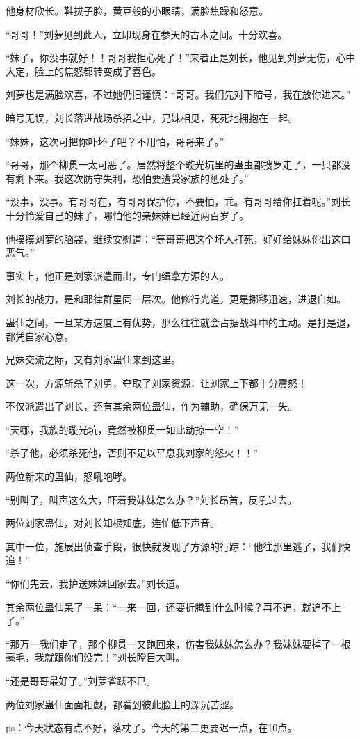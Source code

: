 \begin{this_body}
他身材欣长。鞋拔子脸，黄豆般的小眼睛，满脸焦躁和怒意。

“哥哥！”刘萝见到此人，立即现身在参天的古木之间。十分欢喜。

“妹子，你没事就好！！哥哥我担心死了！”来者正是刘长，他见到刘萝无伤，心中大定，脸上的焦怒都转变成了喜色。

刘萝也是满脸欢喜，不过她仍旧谨慎：“哥哥。我们先对下暗号，我在放你进来。”

暗号无误，刘长落进战场杀招之中，兄妹相见，死死地拥抱在一起。

“妹妹，这次可把你吓坏了吧？不用怕，哥哥来了。”

“哥哥，那个柳贯一太可恶了。居然将整个璇光坑里的蛊虫都搜罗走了，一只都没有剩下来。我这次防守失利，恐怕要遭受家族的惩处了。”

“没事，没事。有哥哥在，有哥哥保护你，不要怕，乖。有哥哥给你扛着呢。”刘长十分怜爱自己的妹子，哪怕他的亲妹妹已经近两百岁了。

他摸摸刘萝的脑袋，继续安慰道：“等哥哥把这个坏人打死，好好给妹妹你出这口恶气。”

事实上，他正是刘家派遣而出，专门缉拿方源的人。

刘长的战力，是和耶律群星同一层次。他修行光道，更是挪移迅速，进退自如。

蛊仙之间，一旦某方速度上有优势，那么往往就会占据战斗中的主动。是打是退，都凭自家心意。

兄妹交流之际，又有刘家蛊仙来到这里。

这一次，方源斩杀了刘勇，夺取了刘家资源，让刘家上下都十分震怒！

不仅派遣出了刘长，还有其余两位蛊仙，作为辅助，确保万无一失。

“天哪，我族的璇光坑，竟然被柳贯一如此劫掠一空！”

“杀了他，必须杀死他，否则不足以平息我刘家的怒火！！”

两位新来的蛊仙，怒吼咆哮。

“别叫了，叫声这么大，吓着我妹妹怎么办？”刘长昂首，反吼过去。

两位刘家蛊仙，对刘长知根知底，连忙低下声音。

其中一位，施展出侦查手段，很快就发现了方源的行踪：“他往那里逃了，我们快追！”

“你们先去，我护送妹妹回家去。”刘长道。

其余两位蛊仙呆了一呆：“一来一回，还要折腾到什么时候？再不追，就追不上了。”

“那万一我们走了，那个柳贯一又跑回来，伤害我妹妹怎么办？我妹妹要掉了一根毫毛，我就跟你们没完！”刘长瞠目大叫。

“还是哥哥最好了。”刘萝雀跃不已。

两位刘家蛊仙面面相觑，都看到彼此脸上的深沉苦涩。

ps：今天状态有点不好，落枕了。今天的第二更要迟一点，在10点。

\end{this_body}

